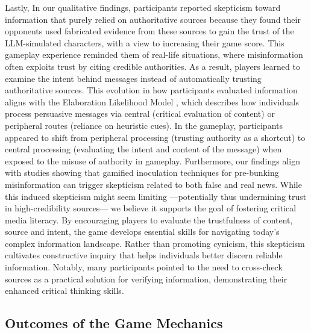 Lastly, In our qualitative findings, participants reported skepticism toward information that purely relied on authoritative sources because they found their opponents used fabricated evidence from these sources to gain the trust of the LLM-simulated characters, with a view to increasing their game score. This gameplay experience reminded them of real-life situations, where misinformation often exploits trust by citing credible authorities. As a result, players learned to examine the intent behind messages instead of automatically trusting authoritative sources. This evolution in how participants evaluated information aligns with the Elaboration Likelihood Model \cite{petty1984source}, which describes how individuals process persuasive messages via central (critical evaluation of content) or peripheral routes (reliance on heuristic cues). In the gameplay, participants appeared to shift from peripheral processing (trusting authority as a shortcut) to central processing (evaluating the intent and content of the message) when exposed to the misuse of authority in gameplay.
Furthermore, our findings align with studies showing that gamified inoculation techniques for pre-bunking misinformation can trigger skepticism related to both false and real news\cite{hameleers2023intended,modirrousta2023gamified}. While this induced skepticism might seem limiting —potentially thus undermining trust in high-credibility sources— we believe it supports the goal of fostering critical media literacy. By encouraging players to evaluate the trustfulness of content, source and intent,  the game develops essential skills for navigating today's complex information landscape. Rather than promoting cynicism, this skepticism cultivates constructive inquiry that helps individuals better discern reliable information. Notably, many participants pointed to the need to cross-check sources as a practical solution for verifying information, demonstrating their enhanced critical thinking skills.  

\subsection{Outcomes of the Game Mechanics}


